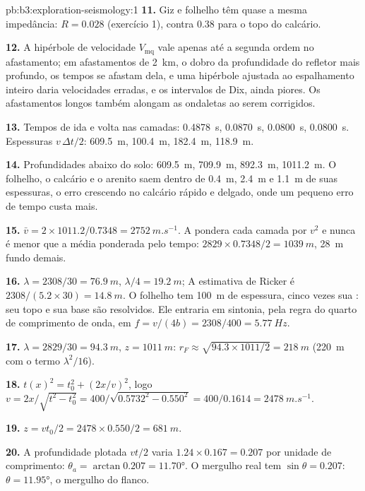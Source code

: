 \begin{solution}{pb:b3:exploration-seismology:1}
\textbf{11.} Giz e folhelho têm quase a mesma impedância: $R = 0.028$
(exercício 1), contra 0.38 para o topo do calcário.

\textbf{12.} A hipérbole de velocidade $V_{\text{mq}}$ vale apenas até a segunda ordem
no afastamento; em afastamentos de \qty{2}{km}, o dobro da profundidade do
refletor mais profundo, os tempos se afastam dela, e uma hipérbole ajustada ao
espalhamento inteiro daria velocidades erradas, e os intervalos de Dix, ainda piores. Os
afastamentos longos também alongam as ondaletas ao serem corrigidos.

\textbf{13.} Tempos de ida e volta nas camadas: \qty{0.4878}{s}, \qty{0.0870}{s},
\qty{0.0800}{s}, \qty{0.0800}{s}. Espessuras $v\,\Delta t/2$: \qty{609.5}{m},
\qty{100.4}{m}, \qty{182.4}{m}, \qty{118.9}{m}.

\textbf{14.} Profundidades abaixo do solo: \qty{609.5}{m}, \qty{709.9}{m},
\qty{892.3}{m}, \qty{1011.2}{m}. O folhelho, o calcário e o arenito saem
dentro de \qty{0.4}{m}, \qty{2.4}{m} e \qty{1.1}{m} de suas espessuras, o
erro crescendo no calcário rápido e delgado, onde um pequeno erro de tempo custa
mais.

\textbf{15.} $\bar v = 2\times1011.2/0.7348 = \qty{2752}{m.s^{-1}}$. A 
pondera cada camada por $v^2$ e nunca é menor que a média ponderada pelo
tempo: $2829\times0.7348/2 = \qty{1039}{m}$, \qty{28}{m} fundo demais.

\textbf{16.} $\lambda = 2308/30 = \qty{76.9}{m}$, $\lambda/4 = \qty{19.2}{m}$;
A estimativa de Ricker é $2308/(5.2\times30) = \qty{14.8}{m}$. O folhelho tem
\qty{100}{m} de espessura, cinco vezes sua : seu topo e sua base são
resolvidos. Ele entraria em sintonia, pela regra do quarto de comprimento de onda, em $f = v/(4b) =
2308/400 = \qty{5.77}{Hz}$.

\textbf{17.} $\lambda = 2829/30 = \qty{94.3}{m}$, $z = \qty{1011}{m}$:
$r_F \approx \sqrt{94.3\times1011/2} = \qty{218}{m}$ (\qty{220}{m} com o
termo $\lambda^2/16$).

\textbf{18.} $t(x)^2 = t_0^2 + (2x/v)^2$, logo $v = 2x/\sqrt{t^2 - t_0^2} =
400/\sqrt{0.5732^2 - 0.550^2} = 400/0.1614 = \qty{2478}{m.s^{-1}}$.

\textbf{19.} $z = vt_0/2 = 2478\times0.550/2 = \qty{681}{m}$.

\textbf{20.} A profundidade plotada $vt/2$ varia $1.24\times0.167 = 0.207$ por
unidade de comprimento: $\theta_a = \arctan0.207 = \ang{11.70}$. O mergulho real tem
$\sin\theta = 0.207$: $\theta = \ang{11.95}$, o mergulho do flanco.


\end{solution}
